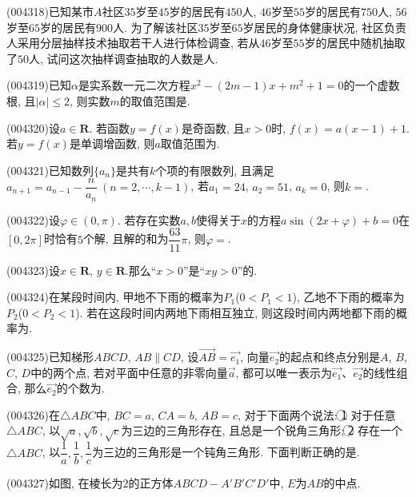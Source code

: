 \item (004318)已知某市$A$社区$35$岁至$45$岁的居民有$450$人, $46$岁至$55$岁的居民有$750$人, $56$岁至$65$岁的居民有$900$人. 为了解该社区$35$岁至$65$岁居民的身体健康状况, 社区负责人采用分层抽样技术抽取若干人进行体检调查, 若从$46$岁至$55$岁的居民中随机抽取了$50$人, 试问这次抽样调查抽取的人数是人.
\item (004319)已知$\alpha$是实系数一元二次方程$x^2-(2m-1)x+m^2+1=0$的一个虚数根, 且$|\alpha|\le 2$, 则实数$m$的取值范围是.
\item (004320)设$a\in \mathbf{R}$. 若函数$y=f(x)$是奇函数, 且$x>0$时, $f(x)=a(x-1)+1$. 若$y=f(x)$是单调增函数, 则$a$取值范围为.
\item (004321)已知数列$\{a_n\}$是共有$k$个项的有限数列, 且满足$a_{n+1}=a_{n-1}-\dfrac n{a_n}\ (n=2,\cdots,k-1)$, 若$a_1=24$, $a_2=51$, $a_k=0$, 则$k=$.
\item (004322)设$\varphi \in (0,\pi)$. 若存在实数$a,b$使得关于$x$的方程$a\sin (2x+\varphi)+b=0$在$[0,2\pi]$时恰有$5$个解, 且解的和为$\dfrac{63}{11}\pi$, 则$\varphi =$.
\item (004323)设$x\in \mathbf{R}$, $y\in \mathbf{R}$.那么``$x>0$''是``$xy>0$''的.
\item (004324)在某段时间内, 甲地不下雨的概率为$P_1$($0<P_1<1$), 乙地不下雨的概率为$P_2$($0<P_2<1$). 若在这段时间内两地下雨相互独立, 则这段时间内两地都下雨的概率为.
\item (004325)已知梯形$ABCD$, $AB\parallel CD$, 设$\overrightarrow{AB}=\overrightarrow{e_1}$, 向量$\overrightarrow{e_2}$的起点和终点分别是$A$, $B$, $C$, $D$中的两个点, 若对平面中任意的非零向量$\overrightarrow a$, 都可以唯一表示为$\overrightarrow{e_1}$、$\overrightarrow{e_2}$的线性组合, 那么$\overrightarrow{e_2}$的个数为.
\item (004326)在$\triangle ABC$中, $BC=a$, $CA=b$, $AB=c$, 对于下面两个说法:
\textcircled{1} 对于任意$\triangle ABC$, 以$\sqrt a,\sqrt b,\sqrt c$为三边的三角形存在, 且总是一个锐角三角形;
\textcircled{2} 存在一个$\triangle ABC$, 以$\dfrac 1a,\dfrac 1b,\dfrac 1c$为三边的三角形是一个钝角三角形.
下面判断正确的是.
\item (004327)如图, 在棱长为$2$的正方体$ABCD-A'B'C'D'$中, $E$为$AB$的中点.
